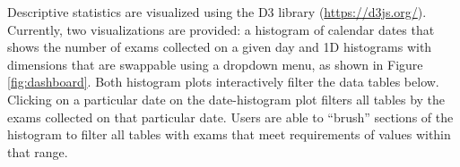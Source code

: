 Descriptive statistics are visualized using the D3 library (\href{https://d3js.org/}{https://d3js.org/}). Currently, two visualizations are provided: a histogram of calendar dates that shows the number of exams collected on a given day and 1D histograms with dimensions that are swappable using a dropdown menu, as shown in Figure \ref{fig:dashboard}. Both histogram plots interactively filter the data tables below. Clicking on a particular date on the date-histogram plot filters all tables by the exams collected on that particular date. Users are able to ``brush'' sections of the histogram to filter all tables with exams that meet requirements of values within that range.  